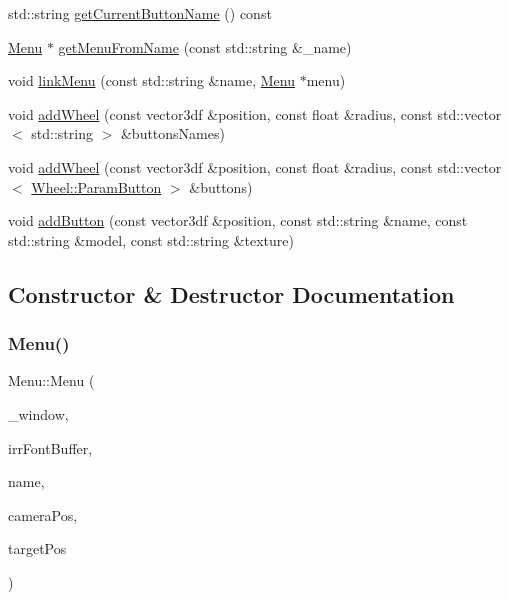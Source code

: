 \begin{DoxyCompactItemize}
std\+::string \mbox{\hyperlink{class_menu_a82e1cb07e79c10467890b04d799d998d}{get\+Current\+Button\+Name}} () const
\item 
\mbox{\hyperlink{class_menu}{Menu}} $\ast$ \mbox{\hyperlink{class_menu_ad4b3784a847783e4c5d004057cfe8c51}{get\+Menu\+From\+Name}} (const std\+::string \&\+\_\+name)
\item 
void \mbox{\hyperlink{class_menu_a652cad89bd210ee73ced43f27c94ad26}{link\+Menu}} (const std\+::string \&name, \mbox{\hyperlink{class_menu}{Menu}} $\ast$menu)
\item 
void \mbox{\hyperlink{class_menu_a367dc9b5e8662346cfa853c91e17ee3b}{add\+Wheel}} (const vector3df \&position, const float \&radius, const std\+::vector$<$ std\+::string $>$ \&buttons\+Names)
\item 
void \mbox{\hyperlink{class_menu_aaef68ff726b362a3807bfa0987430c69}{add\+Wheel}} (const vector3df \&position, const float \&radius, const std\+::vector$<$ \mbox{\hyperlink{struct_wheel_1_1_param_button}{Wheel\+::\+Param\+Button}} $>$ \&buttons)
\item 
void \mbox{\hyperlink{class_menu_a1b9e0149e9112ee9a8d60e65bc5dcbfa}{add\+Button}} (const vector3df \&position, const std\+::string \&name, const std\+::string \&model, const std\+::string \&texture)
\end{DoxyCompactItemize}


\subsection{Constructor \& Destructor Documentation}
\mbox{\label{class_menu_a11bdc9ab879916fe9b8fbd1d0c360a45}} 
\subsubsection{\texorpdfstring{Menu()}{Menu()}}
{\footnotesize\ttfamily Menu\+::\+Menu (\begin{DoxyParamCaption}\item[{\mbox{\hyperlink{class_window}{Window}} \&}]{\+\_\+window,  }\item[{\mbox{\hyperlink{class_irr_font_buffer}{Irr\+Font\+Buffer}} \&}]{irr\+Font\+Buffer,  }\item[{std\+::string}]{name,  }\item[{const vector3df \&}]{camera\+Pos,  }\item[{const vector3df \&}]{target\+Pos }\end{DoxyParamCaption})}


